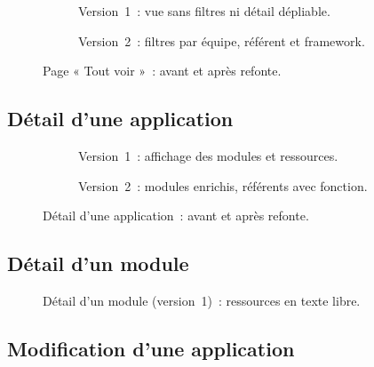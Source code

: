 \begin{figure}[H]
  \centering
  \begin{subfigure}[t]{0.48\textwidth}
    \centering
    \caption{Version~1~: vue sans filtres ni détail dépliable.}
    \label{fig:v1-toutvoir}
  \end{subfigure}
  \hfill
  \begin{subfigure}[t]{0.48\textwidth}
    \centering
    \caption{Version~2~: filtres par équipe, référent et framework.}
    \label{fig:v2-toutvoir}
  \end{subfigure}
  \caption{Page « Tout voir »~: avant et après refonte.}
  \label{fig:ann-toutvoir}
\end{figure}

\subsection*{Détail d'une application}

\begin{figure}[H]
  \centering
  \begin{subfigure}[t]{0.48\textwidth}
    \centering
    \caption{Version~1~: affichage des modules et ressources.}
    \label{fig:v1-detail-app}
  \end{subfigure}
  \hfill
  \begin{subfigure}[t]{0.48\textwidth}
    \centering
    \caption{Version~2~: modules enrichis, référents avec fonction.}
    \label{fig:v2-detail-app}
  \end{subfigure}
  \caption{Détail d'une application~: avant et après refonte.}
  \label{fig:ann-detail-app}
\end{figure}

\subsection*{Détail d'un module}

\begin{figure}[H]
  \centering
  \caption{Détail d'un module (version~1)~: ressources en texte libre.}
  \label{fig:ann-detail-module}
\end{figure}

\subsection*{Modification d'une application}


